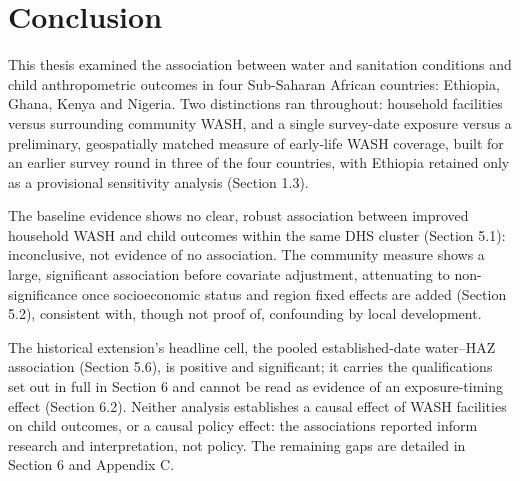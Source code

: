 
\section{Conclusion}\label{sec:7}

This thesis examined the association between water and sanitation conditions and child anthropometric outcomes in four Sub-Saharan African countries: Ethiopia, Ghana, Kenya and Nigeria. Two distinctions ran throughout: household facilities versus surrounding community WASH, and a single survey-date exposure versus a preliminary, geospatially matched measure of early-life WASH coverage, built for an earlier survey round in three of the four countries, with Ethiopia retained only as a provisional sensitivity analysis (Section 1.3).

The baseline evidence shows no clear, robust association between improved household WASH and child outcomes within the same DHS cluster (Section 5.1): inconclusive, not evidence of no association. The community measure shows a large, significant association before covariate adjustment, attenuating to non-significance once socioeconomic status and region fixed effects are added (Section 5.2), consistent with, though not proof of, confounding by local development.

The historical extension's headline cell, the pooled established-date water--HAZ association (Section 5.6), is positive and significant; it carries the qualifications set out in full in Section 6 and cannot be read as evidence of an exposure-timing effect (Section 6.2). Neither analysis establishes a causal effect of WASH facilities on child outcomes, or a causal policy effect: the associations reported inform research and interpretation, not policy. The remaining gaps are detailed in Section 6 and Appendix C.
